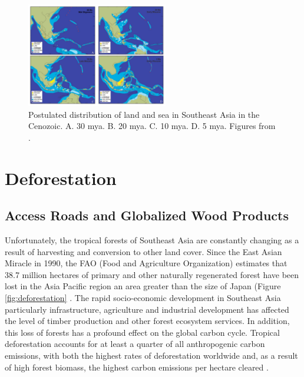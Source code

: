   
   \begin{figure}[ht]
    \centering
        \includegraphics[width = 0.55\textwidth]{graphics/geology.jpg}
        \caption{Postulated distribution of land and sea in Southeast Asia in the Cenozoic. A. 30 mya. B. 20 mya. C. 10 mya. D. 5 mya. Figures from \cite{hall2002cenozoic}.}
    \end{figure} 





\section{Deforestation} 

\subsection{Access Roads and Globalized Wood Products}

Unfortunately, the tropical forests of Southeast Asia are constantly changing as a result of harvesting and conversion to other land cover. Since the East Asian Miracle in 1990, the FAO (Food and Agriculture Organization) estimates that 38.7 million hectares of primary and other naturally regenerated forest have been lost in the Asia Pacific region an area greater than the size of Japan (Figure \ref{fig:deforestation} \citep{faoun163agriculture}. The rapid socio-economic development in Southeast Asia particularly infrastructure, agriculture and industrial development has affected the level of timber production and other forest ecosystem services. In addition, this loss of forests has a profound effect on the global carbon cycle. Tropical deforestation accounts for at least a quarter of all anthropogenic carbon emissions, with both the highest rates of deforestation worldwide and, as a result of high forest biomass, the highest carbon emissions per hectare cleared \citep{corlett2014ecology}.

